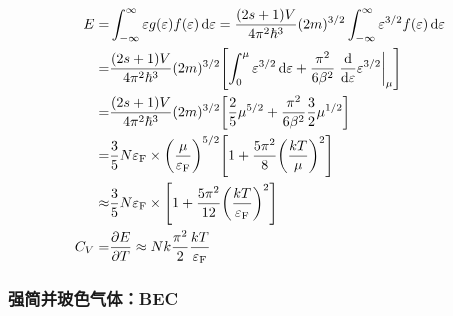 \begin{align*}
    E =                                        & \int_{- \infty}^{\infty} \varepsilon g(\varepsilon) f(\varepsilon) \dd{\varepsilon} = \frac{(2 s + 1) V}{4 \pi^2 \hbar^3} (2 m)^{3 / 2} \int_{- \infty}^{\infty} \varepsilon^{3 / 2} f(\varepsilon) \dd{\varepsilon} \\
    =                                          & \frac{(2 s + 1) V}{4 \pi^2 \hbar^3} (2 m)^{3 / 2} \qty[\int_0^{\mu} \varepsilon^{3/2} \dd{\varepsilon} + \frac{\pi^2}{6 \beta^2} \left.\dv{\varepsilon} \varepsilon^{3/2} \right|_{\mu}]                             \\
    =                                          & \frac{(2 s + 1) V}{4 \pi^2 \hbar^3} (2 m)^{3 / 2} \qty[\frac{2}{5} \mu^{5/2} + \frac{\pi^2}{6 \beta^2} \frac{3}{2} \mu^{1 / 2}]                                                                                      \\
    =                                          & \frac{3}{5} N \varepsilon_{\text{F}} \times \qty(\frac{\mu}{\varepsilon_{\text{F}}})^{5/2} \qty[1 + \frac{5 \pi^2}{8} \qty(\frac{k T}{\mu})^{2}]                                                                     \\
    \approx                                    & \frac{3}{5} N \varepsilon_{\text{F}} \times \qty[1 + \frac{5 \pi^2}{12} \qty(\frac{k T}{\varepsilon_{\text{F}}})^2]                                                                                                  \\
    C_V =                                      & \pdv{E}{T} \approx N k \frac{\pi^2}{2} \frac{k T}{\varepsilon_{\text{F}}}
\end{align*}

\subsubsection{强简并玻色气体：BEC}

